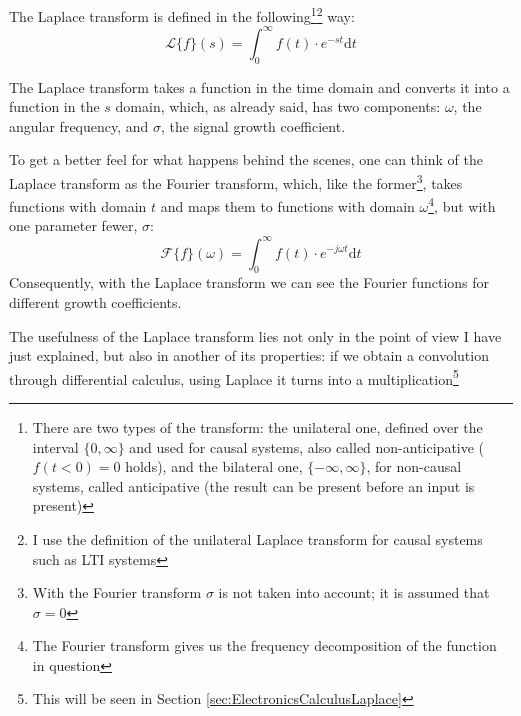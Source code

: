 \documentclass[a4paper, 10pt, final]{article} %
\begin{document}
    \begin{samepage}
        \noindent The Laplace transform is defined in the following\footnote{There are two types of the transform: the unilateral one, defined over the interval $\{0,\infty\}$ and used for causal systems, also called non-anticipative ($f(t<0)=0$ holds), and the bilateral one, $\{-\infty,\infty\}$, for non-causal systems, called anticipative (the result can be present before an input is present)}\:\footnote{I use the definition of the unilateral Laplace transform for causal systems such as LTI systems} way: \nopagebreak
        \[
            \mathcal{L}\{f\}(s) = \int_{0}^{\infty} f(t) \cdot e^{-st} \mathrm{d}t
        \]
    \end{samepage}%
    \noindent The Laplace transform takes a function in the time domain and converts it into a function in the $s$ domain, which, as already said, has two components: $\omega$, the angular frequency, and $\sigma$, the signal growth coefficient.
    \begin{samepage}
        To get a better feel for what happens behind the scenes, one can think of the Laplace transform as the Fourier transform, which, like the former\footnote{With the Fourier transform $\sigma$ is not taken into account; it is assumed that $\sigma = 0$}, takes functions with domain $t$ and maps them to functions with domain $\omega$\footnote{The Fourier transform gives us the frequency decomposition of the function in question}, but with one parameter fewer, $\sigma$:
        \[
            \mathcal{F}\{f\}(\omega) = \int_{0}^{\infty} f(t) \cdot e^{-j\omega t} \mathrm{d}t
        \]
        \noindent Consequently, with the Laplace transform we can see the Fourier functions for different growth coefficients.
    \end{samepage}%
    
    The usefulness of the Laplace transform lies not only in the point of view I have just explained, but also in another of its properties: if we obtain a convolution through differential calculus, using Laplace it turns into a multiplication\footnote{This will be seen in Section \ref{sec:ElectronicsCalculusLaplace}}
\end{document}
